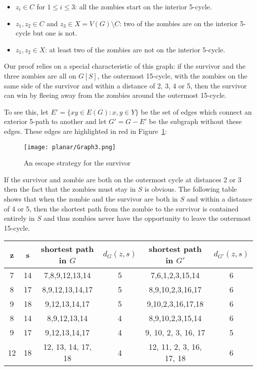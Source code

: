 \begin{itemize}
\item $z_i \in C$ for $1 \leq i \leq 3$: all the zombies start on the interior 5-cycle.
\item $z_1, z_2 \in C$ and $z_3 \in X = V(G) \setminus C$: two of the zombies are on the interior 5-cycle but one is not.
\item $z_1, z_2 \in X$: at least two of the zombies are not on the interior 5-cycle.
\end{itemize}

Our proof relies on a special characteristic of this graph: if the survivor and the three zombies are all on $G[S]$, the outermost 15-cycle,  with
the zombies on the same side of the survivor and within a distance of 2, 3, 4 or 5, then the survivor can win by fleeing away from the zombies around the outermost 15-cycle.

To see this, let $E' = \{xy \in E(G) : x, y \in Y\}$ be the set of edges which connect an exterior 5-path to another and let $G' = G - E'$ be the subgraph without these edges.
These edges are highlighted in red in Figure~\ref{fig:planarG3}:

\begin{figure}
\centering
\texttt{[image: planar/Graph3.png]}
\caption{An escape strategy for the survivor\label{fig:planarG3}}
\end{figure}

If the survivor and zombie are both on the outermost cycle at distances 2 or 3 then
the fact that the zombies must stay in $S$ is obvious.
The following table shows that when the zombie and the survivor are both in $S$ and within a distance of 4 or 5, then the shortest path from the zombie to the survivor is contained entirely in $S$ and thus zombies never have the opportunity to leave the outermost 15-cycle.

\begin{tabular}{c | c | c | c | c | c}
z & s & shortest path in $G$ & $d_{G}(z,s)$ & shortest path in $G'$ & $d_{G'}(z,s)$  \\
\hline
7 & 14 & 7,8,9,12,13,14 & 5 & 7,6,1,2,3,15,14 & 6 \\
8 & 17 & 8,9,12,13,14,17 & 5 & 8,9,10,2,3,16,17 & 6 \\
9 & 18 & 9,12,13,14,17 & 5 & 9,10,2,3,16,17,18 & 6 \\
\hline
8 & 14 & 8,9,12,13,14 & 4 & 8,9,10,2,3,15,14 & 6 \\
9 & 17 & 9,12,13,14,17 & 4 & 9, 10, 2, 3, 16, 17 & 5 \\
12 & 18 & 12, 13, 14, 17, 18 & 4 & 12, 11, 2, 3, 16, 17, 18 & 6
\end{tabular}

